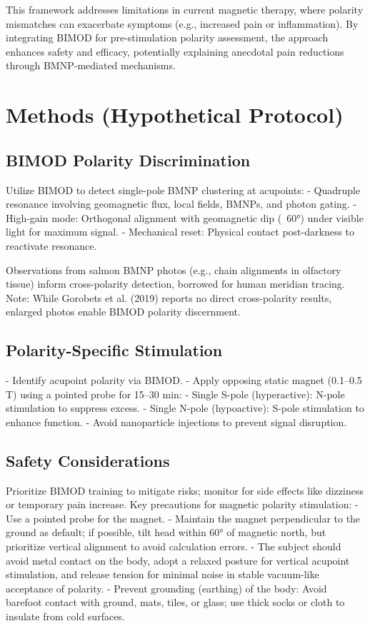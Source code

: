 \documentclass{article}
\begin{document}
This framework addresses limitations in current magnetic therapy, where polarity mismatches can exacerbate symptoms (e.g., increased pain or inflammation)\citep{gluszko2024, webmd2025}. By integrating BIMOD for pre-stimulation polarity assessment, the approach enhances safety and efficacy, potentially explaining anecdotal pain reductions through BMNP-mediated mechanisms\citep{elgohary2019, clinicaladvisor2011}.

\section{Methods (Hypothetical Protocol)}
\subsection{BIMOD Polarity Discrimination}
Utilize BIMOD to detect single-pole BMNP clustering at acupoints:
- Quadruple resonance involving geomagnetic flux, local fields, BMNPs, and photon gating.
- High-gain mode: Orthogonal alignment with geomagnetic dip (~60°) under visible light for maximum signal.
- Mechanical reset: Physical contact post-darkness to reactivate resonance.

Observations from salmon BMNP photos (e.g., chain alignments in olfactory tissue) inform cross-polarity detection, borrowed for human meridian tracing\citep{gorobets2019}. Note: While Gorobets et al. (2019) reports no direct cross-polarity results, enlarged photos enable BIMOD polarity discernment.

\subsection{Polarity-Specific Stimulation}
- Identify acupoint polarity via BIMOD.
- Apply opposing static magnet (0.1–0.5 T) using a pointed probe for 15–30 min:
  - Single S-pole (hyperactive): N-pole stimulation to suppress excess.
  - Single N-pole (hypoactive): S-pole stimulation to enhance function.
- Avoid nanoparticle injections to prevent signal disruption\citep{healthcentral2019}.

\subsection{Safety Considerations}
Prioritize BIMOD training to mitigate risks; monitor for side effects like dizziness or temporary pain increase\citep{sciencedirect2026}. Key precautions for magnetic polarity stimulation:
- Use a pointed probe for the magnet.
- Maintain the magnet perpendicular to the ground as default; if possible, tilt head within 60° of magnetic north, but prioritize vertical alignment to avoid calculation errors.
- The subject should avoid metal contact on the body, adopt a relaxed posture for vertical acupoint stimulation, and release tension for minimal noise in stable vacuum-like acceptance of polarity.
- Prevent grounding (earthing) of the body: Avoid barefoot contact with ground, mats, tiles, or glass; use thick socks or cloth to insulate from cold surfaces.
\end{document}

